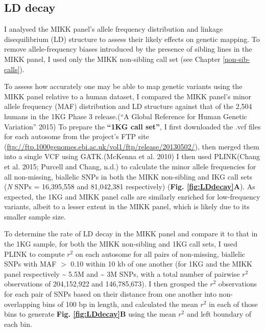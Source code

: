 \documentclass[
]{book}
\begin{document}
\hypertarget{ld-decay-sec}{%
\subsection{LD decay}\label{ld-decay-sec}}

I analysed the MIKK panel's allele frequency distribution and linkage disequilibrium (LD) structure to assess their likely effects on genetic mapping. To remove allele-frequency biases introduced by the presence of sibling lines in the MIKK panel, I used only the MIKK non-sibling call set (see Chapter \ref{non-sib-calls}).

To assess how accurately one may be able to map genetic variants using the MIKK panel relative to a human dataset, I compared the MIKK panel's minor allele frequency (MAF) distribution and LD structure against that of the 2,504 humans in the 1KG Phase 3 release.({``A Global Reference for Human Genetic Variation''} 2015) To prepare the \textbf{``1KG call set''}, I first downloaded the .vcf files for each autosome from the project's FTP site (\url{ftp://ftp.1000genomes.ebi.ac.uk/vol1/ftp/release/20130502/}), then merged them into a single VCF using GATK.(McKenna et al. 2010) I then used PLINK(Chang et al. 2015; Purcell and Chang, n.d.) to calculate the minor allele frequencies for all non-missing, biallelic SNPs in both the MIKK non-sibling and IKG call sets (\emph{N} SNPs = 16,395,558 and 81,042,381 respectively) (\textbf{Fig. \ref{fig:LDdecay}A}). As expected, the 1KG and MIKK panel calls are similarly enriched for low-frequency variants, albeit to a lesser extent in the MIKK panel, which is likely due to its smaller sample size.

To determine the rate of LD decay in the MIKK panel and compare it to that in the 1KG sample, for both the MIKK non-sibling and 1KG call sets, I used PLINK to compute \(r^2\) on each autosome for all pairs of non-missing, biallelic SNPs with MAF \(>\) 0.10 within 10 kb of one another (for 1KG and the MIKK panel respectively \textasciitilde{} 5.5M and \textasciitilde{} 3M SNPs, with a total number of pairwise \(r^2\) observations of 204,152,922 and 146,785,673). I then grouped the \(r^2\) observations for each pair of SNPs based on their distance from one another into non-overlapping bins of 100 bp in length, and calculated the mean \(r^2\) in each of those bins to generate \textbf{Fig. \ref{fig:LDdecay}B} using the mean \(r^2\) and left boundary of each bin.
\end{document}
